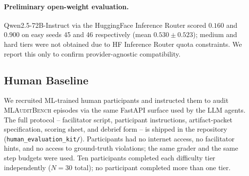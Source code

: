 \documentclass{article}
\begin{document}
\paragraph{Preliminary open-weight evaluation.}
Qwen2.5-72B-Instruct via the HuggingFace Inference Router scored
$0.160$ and $0.900$ on easy seeds 45 and 46 respectively (mean
$0.530\pm0.523$); medium and hard tiers were not obtained due to
HF Inference Router quota constraints.  We report this only to
confirm provider-agnostic compatibility.

\subsection{Human Baseline}
\label{sec:human}

We recruited ML-trained human participants and instructed them to audit
\textsc{MLAuditBench} episodes via the same FastAPI surface used by the
LLM agents.  The full protocol -- facilitator script, participant
instructions, artifact-packet specification, scoring sheet, and
debrief form -- is shipped in the repository (\texttt{human\_evaluation\_kit/}).
Participants had no internet access, no facilitator hints, and no access
to ground-truth violations; the same grader and the same step budgets
were used.
Ten participants completed each difficulty tier independently
($N{=}30$ total); no participant completed more than one tier.
\end{document}
